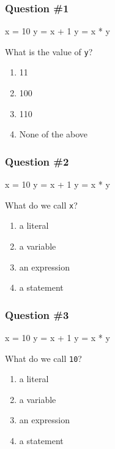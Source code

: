 \documentclass[11pt]{beamer}
\begin{document}
\begin{frame}[fragile]
  \frametitle{Question \#1}
  \Enlarge

  \begin{semiverbatim}
x = 10
y = x + 1
y = x * y
  \end{semiverbatim}
  What is the value of \texttt{y}?
  \begin{enumerate}[label=\Alph*]
  \item  11
  \item  100
  \item  110
  \item  None of the above
  \end{enumerate}
\end{frame}

\begin{frame}[fragile]
  \frametitle{Question \#2}
  \Enlarge

  \begin{semiverbatim}
x = 10
y = x + 1
y = x * y
  \end{semiverbatim}
  What do we call \texttt{x}?
  \begin{enumerate}[label=\Alph*]
  \item  a literal
  \item  a variable
  \item  an expression
  \item  a statement
  \end{enumerate}
\end{frame}

\begin{frame}[fragile]
  \frametitle{Question \#3}
  \Enlarge

  \begin{semiverbatim}
x = 10
y = x + 1
y = x * y
  \end{semiverbatim}
  What do we call \texttt{10}?
  \begin{enumerate}[label=\Alph*]
  \item  a literal
  \item  a variable
  \item  an expression
  \item  a statement
  \end{enumerate}
\end{frame}
\end{document}
